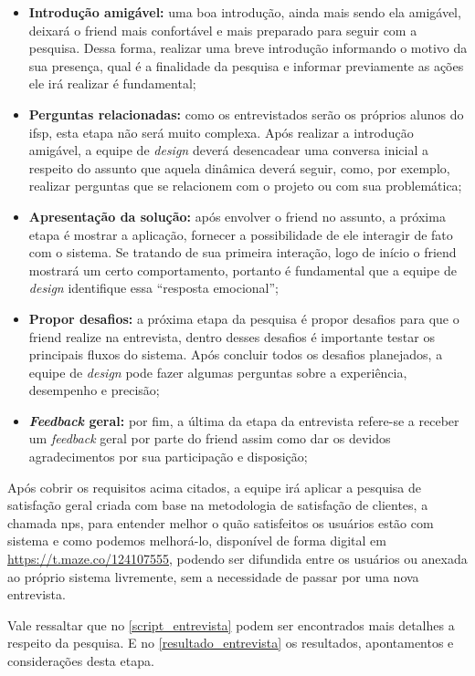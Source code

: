 \begin{itemize}
    \item \textbf{Introdução amigável:} uma boa introdução, ainda mais sendo ela amigável, deixará o \gls{friend} mais confortável e mais preparado para seguir com a pesquisa. Dessa forma, realizar uma breve introdução informando o motivo da sua presença, qual é a finalidade da pesquisa e informar previamente as ações ele irá realizar é fundamental;
    \item \textbf{Perguntas relacionadas:} como os entrevistados serão os próprios alunos do \acs{ifsp}, esta etapa não será muito complexa. Após realizar a introdução amigável, a equipe de \textit{design} deverá desencadear uma conversa inicial a respeito do assunto que aquela dinâmica deverá seguir, como, por exemplo, realizar perguntas que se relacionem com o projeto ou com sua problemática; 
    \item \textbf{Apresentação da solução:} após envolver o \gls{friend} no assunto, a próxima etapa é mostrar a aplicação, fornecer a possibilidade de ele interagir de fato com o sistema. Se tratando de sua primeira interação, logo de início o \gls{friend} mostrará um certo comportamento, portanto é fundamental que a equipe de \textit{design} identifique essa ``resposta emocional'';
    \item \textbf{Propor desafios:} a próxima etapa da pesquisa é propor desafios para que o \gls{friend} realize na entrevista, dentro desses desafios é importante testar os principais fluxos do sistema. Após concluir todos os desafios planejados, a equipe de \textit{design} pode fazer algumas perguntas sobre a experiência, desempenho e precisão; 
    \item \textbf{\textit{Feedback} geral:} por fim, a última da etapa da entrevista refere-se a receber um \textit{feedback} geral por parte do \gls{friend} assim como dar os devidos agradecimentos por sua participação e disposição;
\end{itemize}

Após cobrir os requisitos acima citados, a equipe irá aplicar a pesquisa de satisfação geral criada com base na metodologia de satisfação de clientes, a chamada \acs{nps}, para entender melhor o quão satisfeitos os usuários estão com sistema e como podemos melhorá-lo, disponível de forma digital em \href{https://t.maze.co/124107555}{https://t.maze.co/124107555}, podendo ser difundida entre os usuários ou anexada ao próprio sistema livremente, sem a necessidade de passar por uma nova entrevista.

Vale ressaltar que no \autoref{script_entrevista} podem ser encontrados mais detalhes a respeito da pesquisa. E no \autoref{resultado_entrevista} os resultados, apontamentos e considerações desta etapa. 

